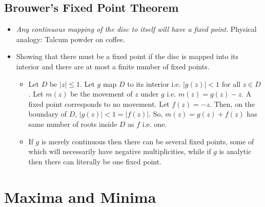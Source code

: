 \documentclass[12pt]{article}
\def\tt{\textit}
\begin{document}
\subsection{Brouwer's Fixed Point Theorem}
\begin{itemize}
    \item \tt{Any continuous mapping of the disc to itself will have a fixed point}. Physical analogy: Talcum powder on coffee.
    \item Showing that there must be a fixed point if the disc is mapped into its interior and there are at most a finite number of fixed points.
    \begin{itemize}
        \item Let $D$ be $|z|\leq 1$. Let $g$ map $D$ to its interior i.e. $|g(z)|<1$ for all $z \in D$. Let $m(z)$ be the movement of $z$ under $g$ i.e. $m(z)=g(z)-z$. A fixed point corresponds to no movement. Let $f(z) = -z$. Then, on the boundary of $D$, $|g(z)| < 1 = |f(z)|$. So, $m(z)=g(z)+f(z)$ has same number of roots inside $D$ as $f$ i.e. one.
        \item If $g$ is merely continuous then there can be several fixed points, some of which will necessarily have negative multiplicities, while if $g$ is analytic then there can literally be one fixed point.
    \end{itemize}
\end{itemize}
\section{Maxima and Minima}
\end{document}
